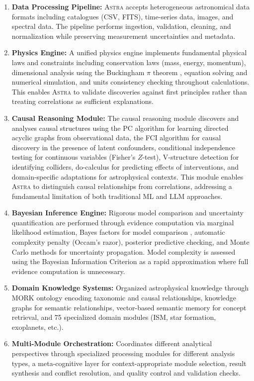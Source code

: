 \documentclass[fleqn,usenatbib]{mnras}
\newcommand{\astra}{\textsc{Astra}\xspace}
\newcommand{\pc}{PC\xspace}
\newcommand{\fci}{FCI\xspace}
\begin{document}
\begin{enumerate}
  \item \textbf{Data Processing Pipeline:}
  \astra accepts heterogeneous astronomical data formats including catalogues (CSV, FITS), time-series data, images, and spectral data.
  The pipeline performs ingestion, validation, cleaning, and normalization while preserving measurement uncertainties and metadata.

  \item \textbf{Physics Engine:}
  A unified physics engine implements fundamental physical laws and constraints including conservation laws (mass, energy, momentum), dimensional analysis using the Buckingham $\pi$ theorem \citep{Buckingham1914}, equation solving and numerical simulation, and units consistency checking throughout calculations.
  This enables \astra to validate discoveries against first principles rather than treating correlations as sufficient explanations.

  \item \textbf{Causal Reasoning Module:}
  The causal reasoning module discovers and analyses causal structures using the \pc algorithm \citep{Spirtes2000} for learning directed acyclic graphs from observational data, the \fci algorithm \citep{Zhang2008} for causal discovery in the presence of latent confounders, conditional independence testing for continuous variables (Fisher's $Z$-test), V-structure detection for identifying colliders, do-calculus \citep{Pearl2009} for predicting effects of interventions, and domain-specific adaptations for astrophysical contexts.
  This module enables \astra to distinguish causal relationships from correlations, addressing a fundamental limitation of both traditional ML and LLM approaches.

  \item \textbf{Bayesian Inference Engine:}
  Rigorous model comparison and uncertainty quantification are performed through evidence computation via marginal likelihood estimation, Bayes factors for model comparison \citep{KassRaftery1995}, automatic complexity penalty (Occam's razor), posterior predictive checking, and Monte Carlo methods for uncertainty propagation.
  Model complexity is assessed using the Bayesian Information Criterion \citep[BIC;][]{Schwarz1978} as a rapid approximation where full evidence computation is unnecessary.

  \item \textbf{Domain Knowledge Systems:}
  Organized astrophysical knowledge through MORK ontology encoding taxonomic and causal relationships, knowledge graphs for semantic relationships, vector-based semantic memory for concept retrieval, and 75 specialized domain modules (ISM, star formation, exoplanets, etc.).

  \item \textbf{Multi-Module Orchestration:}
  Coordinates different analytical perspectives through specialized processing modules for different analysis types, a meta-cognitive layer for context-appropriate module selection, result synthesis and conflict resolution, and quality control and validation checks.
\end{enumerate}
\end{document}
